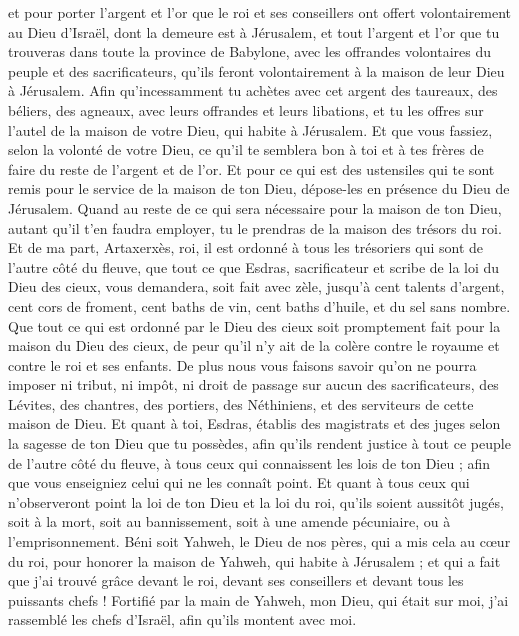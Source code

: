 \begin{multicols}{2}
et pour porter l'argent et l'or que le roi et ses conseillers ont offert volontairement au Dieu d'Israël, dont la demeure est à Jérusalem,
et tout l'argent et l'or que tu trouveras dans toute la province de Babylone, avec les offrandes volontaires du peuple et des sacrificateurs, qu'ils feront volontairement à la maison de leur Dieu à Jérusalem.
Afin qu'incessamment tu achètes avec cet argent des taureaux, des béliers, des agneaux, avec leurs offrandes et leurs libations, et tu les offres sur l'autel de la maison de votre Dieu, qui habite à Jérusalem.
Et que vous fassiez, selon la volonté de votre Dieu, ce qu'il te semblera bon à toi et à tes frères de faire du reste de l'argent et de l'or.
Et pour ce qui est des ustensiles qui te sont remis pour le service de la maison de ton Dieu, dépose-les en présence du Dieu de Jérusalem.
Quand au reste de ce qui sera nécessaire pour la maison de ton Dieu, autant qu'il t'en faudra employer, tu le prendras de la maison des trésors du roi.
Et de ma part, Artaxerxès, roi, il est ordonné à tous les trésoriers qui sont de l'autre côté du fleuve, que tout ce que Esdras, sacrificateur et scribe de la loi du Dieu des cieux, vous demandera, soit fait avec zèle,
jusqu'à cent talents d'argent, cent cors de froment, cent baths de vin, cent baths d'huile, et du sel sans nombre.
Que tout ce qui est ordonné par le Dieu des cieux soit promptement fait pour la maison du Dieu des cieux, de peur qu'il n'y ait de la colère contre le royaume et contre le roi et ses enfants.
De plus nous vous faisons savoir qu'on ne pourra imposer ni tribut, ni impôt, ni droit de passage sur aucun des sacrificateurs, des Lévites, des chantres, des portiers, des Néthiniens, et des serviteurs de cette maison de Dieu.
Et quant à toi, Esdras, établis des magistrats et des juges selon la sagesse de ton Dieu que tu possèdes, afin qu'ils rendent justice à tout ce peuple de l'autre côté du fleuve, à tous ceux qui connaissent les lois de ton Dieu ; afin que vous enseigniez celui qui ne les connaît point.
Et quant à tous ceux qui n'observeront point la loi de ton Dieu et la loi du roi, qu'ils soient aussitôt jugés, soit à la mort, soit au bannissement, soit à une amende pécuniaire, ou à l'emprisonnement.
Béni soit Yahweh, le Dieu de nos pères, qui a mis cela au cœur du roi, pour honorer la maison de Yahweh, qui habite à Jérusalem ;
et qui a fait que j'ai trouvé grâce devant le roi, devant ses conseillers et devant tous les puissants chefs ! Fortifié par la main de Yahweh, mon Dieu, qui était sur moi, j'ai rassemblé les chefs d'Israël, afin qu'ils montent avec moi.

\end{multicols}
